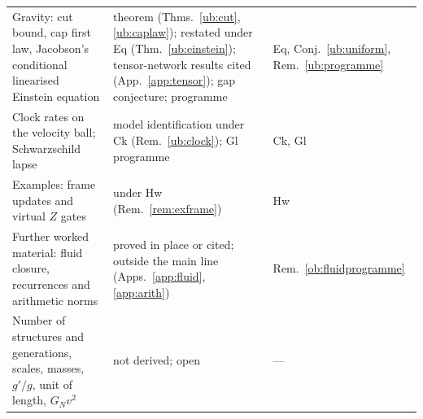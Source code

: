 \documentclass[aps,pra,onecolumn,superscriptaddress,nofootinbib,10pt]{revtex4-2}
\theoremstyle{definition}
\theoremstyle{remark}
\begin{document}
\begin{table}[p]
\begin{tabular}{@{}p{}p{}p{}@{}}
{Gravity: cut bound, cap first law, Jacobson's conditional linearised Einstein equation} & theorem (Thms.~\ref{ub:cut}, \ref{ub:caplaw}); restated under Eq (Thm.~\ref{ub:einstein}); tensor-network results cited (App.~\ref{app:tensor}); gap conjecture; programme & Eq, Conj.~\ref{ub:uniform}, Rem.~\ref{ub:programme}\\
{Clock rates on the velocity ball; Schwarzschild lapse} & model identification under Ck (Rem.~\ref{ub:clock}); Gl programme & Ck, Gl\\
{Examples: frame updates and virtual $Z$ gates} & under Hw (Rem.~\ref{rem:exframe}) & Hw\\
{Further worked material: fluid closure, recurrences and arithmetic norms} & proved in place or cited; outside the main line (Apps.~\ref{app:fluid}, \ref{app:arith}) & Rem.~\ref{ob:fluidprogramme}\\
{Number of structures and generations, scales, masses, $g'/g$, unit of length, $G_Nv^2$} & not derived; open & ---\\
\bottomrule
\end{tabular}
\end{table}
\end{document}
